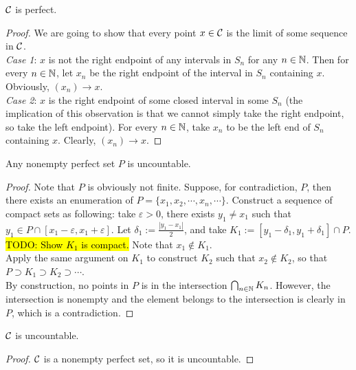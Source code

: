 \documentclass[11pt]{article}
\begin{document}
	\begin{proposition}
		$\mathcal{{C}}$ is perfect.
	\end{proposition}
	
	\begin{proof}
		We are going to show that every point $x \in \mathcal{{C}}$ is the limit of some sequence in $\mathcal{{C}}$. \\
		\emph{Case 1}: $x$ is not the right endpoint of any intervals in $S_n$ for any $n \in \mathbb{N}$. Then for every $n \in \mathbb{N}$, let $x_n$ be the right endpoint of the interval in $S_n$ containing $x$. Obviously, $(x_n) \to x$. \\
		\emph{Case 2}: $x$ is the right endpoint of some closed interval in some $S_n$ (the implication of this observation is that we cannot simply take the right endpoint, so take the left endpoint). For every $n \in \mathbb{N}$, take $x_n$ to be the left end of $S_n$ containing $x$. Clearly, $(x_n) \to x$.
	\end{proof}
	
	\begin{theorem}
		Any nonempty perfect set $P$ is uncountable.
	\end{theorem}

	\begin{proof}
		Note that $P$ is obviously not finite. Suppose, for contradiction, $P$, then there exists an enumeration of $P = \{x_1, x_2, \cdots, x_n, \cdots \}$. Construct a sequence of compact sets as following: take $\varepsilon > 0$, there exists $y_1 \neq x_1$ such that $y_1 \in P \cap [x_1 - \varepsilon, x_1 + \varepsilon]$. Let $\delta_1 := \frac{|y_1 - x_1|}{2}$, and take $K_1 := [y_1 - \delta_1, y_1 + \delta_1] \cap P$. \hl{TODO: Show $K_1$ is compact.} Note that $x_1 \notin K_1$. \\
		Apply the same argument on $K_1$ to construct $K_2$ such that $x_2 \notin K_2$, so that $P \supset K_1 \supset K_2 \supset \cdots $. \\
		By construction, no points in $P$ is in the intersection $\bigcap_{n \in \mathbb{N}} K_n$. However, the intersection is nonempty and the element belongs to the intersection is clearly in $P$, which is a contradiction. 
	\end{proof}

	\begin{proposition}
		$\mathcal{{C}}$ is uncountable.
	\end{proposition}
	
	\begin{proof}
		$\mathcal{{C}}$ is a nonempty perfect set, so it is uncountable.
	\end{proof}
	
\end{document}
